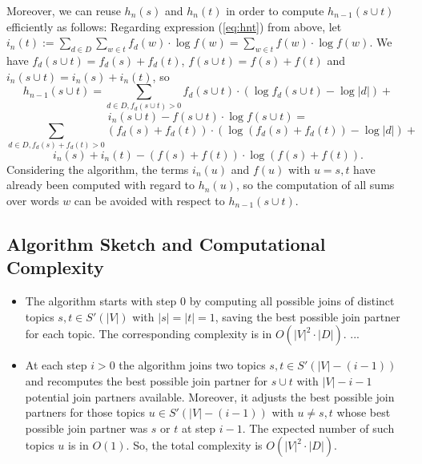 \documentclass[10pt, a4paper, oneside]{article}
\begin{document}
Moreover, we can reuse $h_n(s)$ and $h_n(t)$ in order to compute $h_{n - 1}(s \cup t)$ efficiently as follows: 
Regarding expression (\ref{eq:hnt}) from above, let $i_n(t) := \sum_{d \in D} \sum_{w\in t} f_d(w) \cdot \log f(w) = \sum_{w\in t} f(w) \cdot \log f(w)$. 
We have 
$f_d(s \cup t) = f_d(s) + f_d(t)$, $f(s \cup t) = f(s) + f(t)$ and $i_n(s \cup t) = i_n(s) + i_n(t)$, so
\[ h_{n - 1}(s \cup t) = \sum_{d \in D, f_d(s \cup t) > 0} f_d(s \cup t) \cdot (\log f_d(s \cup t) - \log |d|) + \]
\[i_n(s \cup t) - f(s \cup t) \cdot \log f(s \cup t) = \]
\[\sum_{d \in D, f_d(s) + f_d(t) > 0} (f_d(s) + f_d(t)) \cdot (\log (f_d(s) + f_d(t)) - \log |d|) + \]
\[i_n(s) + i_n(t) - (f(s) + f(t)) \cdot \log (f(s) + f(t)).\]
Considering the algorithm, the terms $i_n(u)$ and $f(u)$ with $u = s, t$ have already been computed with regard to
$h_{n}(u)$, so the computation of all sums over words $w$ can be avoided with respect to $h_{n - 1}(s \cup t)$.

\subsection{Algorithm Sketch and Computational Complexity}
\label{complexity}
\begin{itemize}
\item The algorithm starts with step 0 by computing all possible joins of distinct topics $s,t \in S'(|V|)$ with $|s| = |t| = 1$, saving the best possible join partner for each topic.
The corresponding complexity is in $O(|V|^2 \cdot |D|)$. ...
\item At each step $i > 0$ the algorithm joins two topics $s,t \in S'(|V| - (i - 1))$ and recomputes the best possible join partner for $s \cup t$ with $|V| - i - 1$ potential join partners available.
Moreover, it adjusts the best possible join partners for those topics $u \in S'(|V| - (i - 1))$ with $u \neq s,t$ whose best possible join partner was $s$ or $t$ at step $i - 1$. The expected number of such topics $u$ is in $O(1)$. So, the total complexity is 
$O(|V|^2 \cdot |D|)$.
\end{itemize}
\end{document}
